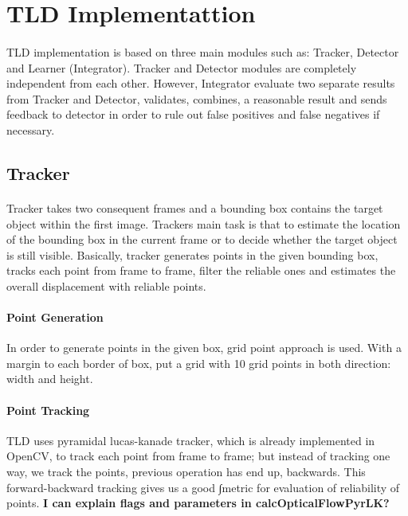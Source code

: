\documentclass{article}
\begin{document}
    \section{TLD Implementattion}
        \paragraph{}
            TLD implementation is based on three main modules such as: Tracker, Detector and Learner (Integrator).
            Tracker and Detector modules are completely independent from each other.
            However, Integrator evaluate two separate results from Tracker and Detector, validates, combines,
            a reasonable result and sends feedback to detector in order to rule out false positives and false negatives
            if necessary.
        \subsection{Tracker}
            \paragraph{}
                Tracker takes two consequent frames and a bounding box contains the target object within the first image.
                Trackers main task is that to estimate the location of the bounding box in the current frame or to decide whether the
                target object is still visible. Basically, tracker generates points in the given bounding box,
                tracks each point from frame to frame, filter the reliable ones and estimates the overall displacement
                with reliable points.
            \paragraph{Point Generation}
                In order to generate points in the given box, grid point approach is used. With a margin to each border of box,
                put a grid with 10 grid points in both direction: width and height.
            \paragraph{Point Tracking}
                TLD uses pyramidal lucas-kanade tracker, which is already implemented in OpenCV, to track each point from frame
                to frame; but instead of tracking one way, we track the points, previous operation has end up, backwards.
                This forward-backward tracking gives us a good ∫metric for evaluation of reliability of points.
                \textbf{I can explain flags and parameters in calcOpticalFlowPyrLK?}
\end{document}
